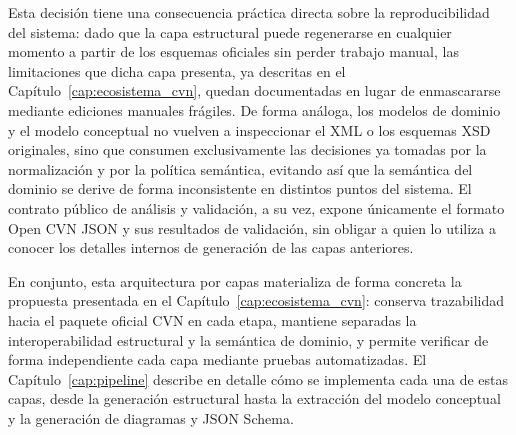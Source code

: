 Esta decisión tiene una consecuencia práctica directa sobre la
reproducibilidad del sistema: dado que la capa estructural puede regenerarse en
cualquier momento a partir de los esquemas oficiales sin perder trabajo manual,
las limitaciones que dicha capa presenta, ya descritas en el
Capítulo~\ref{cap:ecosistema_cvn}, quedan documentadas en lugar de
enmascararse mediante ediciones manuales frágiles. De forma análoga, los
modelos de dominio y el modelo conceptual no vuelven a inspeccionar el XML o
los esquemas XSD originales, sino que consumen exclusivamente las decisiones ya
tomadas por la normalización y por la política semántica, evitando así que la
semántica del dominio se derive de forma inconsistente en distintos puntos del
sistema. El contrato público de análisis y validación, a su vez, expone
únicamente el formato Open CVN JSON y sus resultados de validación, sin
obligar a quien lo utiliza a conocer los detalles internos de generación de las
capas anteriores.

En conjunto, esta arquitectura por capas materializa de forma concreta la
propuesta presentada en el Capítulo~\ref{cap:ecosistema_cvn}: conserva
trazabilidad hacia el paquete oficial CVN en cada etapa, mantiene separadas la
interoperabilidad estructural y la semántica de dominio, y permite verificar de
forma independiente cada capa mediante pruebas automatizadas. El
Capítulo~\ref{cap:pipeline} describe en detalle cómo se implementa cada una
de estas capas, desde la
generación estructural hasta la extracción del modelo conceptual y la
generación de diagramas y JSON Schema.
